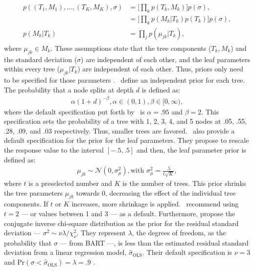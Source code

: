 \documentclass[3p,12pt,a4paper]{elsarticle}
\begin{document}
\begin{align}
\begin{split}
    \label{eq:independence_prior}
    p((T_1, M_1), \dots, (T_K, M_K), \sigma) &= \Big[\prod_{k}p(T_k, M_k)\Big]p(\sigma), \\
    &= \Big[\prod_{k}p(M_k|T_k)p(T_k)\Big]p(\sigma), \\
    p(M_k|T_k) &= \prod_{j}p(\mu_{jk}|T_k),
\end{split}
\end{align} where $\mu_{jk} \in M_k$. These assumptions state that the tree components ($T_{k}, M_{k}$) and the standard deviation ($\sigma$) are independent of each other, and the leaf parameters within every tree ($\mu_{jk}|T_{k}$) are independent of each other. Thus, priors only need to be specified for those parameters \citep{chipman2010, hill2020, chipman2006, chipman1998}.~\citet{chipman1998} define an independent prior for each tree. The probability that a node splits at depth $d$ is defined as: 
\begin{align}
\label{eq:tree_prior}
    \alpha(1+d)^{-\beta}, \alpha \in (0,1), \beta \in [0, \infty),
\end{align} where the default specification put forth by~\citet{chipman2006,chipman2010} is $\alpha = .95$ and $\beta = 2$. This specification sets the probability of a tree with 1, 2, 3, 4, and 5 nodes at .05, .55, .28, .09, and .03 respectively. Thus, smaller trees are favored.~\citet{chipman2006,chipman2010} also provide a default specification for the prior for the leaf parameters. They propose to rescale the response value to the interval $[-.5,.5]$ and then, the leaf parameter prior is defined as: 
\begin{align}
\label{eq:leaf_prior}
    \mu_{jk} \sim \mathcal{N}(0, \sigma^2_{\mu}), \text{with } \sigma^2_{\mu} = \frac{.5}{t\sqrt{K}},
\end{align} where $t$ is a preselected number and $K$ is the number of trees. This prior shrinks the tree parameters $\mu_{jk}$ towards 0, decreasing the effect of the individual tree components. If $t$ or $K$ increases, more shrinkage is applied.~\citet{chipman2006,chipman2010} recommend using $t = 2$ --- or values between 1 and 3 --- as a default. Furthermore, \citet{chipman2006,chipman2010} propose the conjugate inverse chi-square distribution as the prior for the residual standard deviation --- $\sigma^2 \sim \nu\lambda/\chi^{2}_{\nu}$. They represent $\lambda$, the degrees of freedom, as the probability that $\sigma$ --- from BART ---, is less than the estimated residual standard deviation from a linear regression model, $\hat{\sigma}_\text{OLS}$. Their default specification is $\nu = 3$ and $\text{Pr}(\sigma < \hat{\sigma}_\text{OLS}) = \lambda = .9$ \citep{chipman2010, hill2020, chipman2006, chipman1998}.
\end{document}
